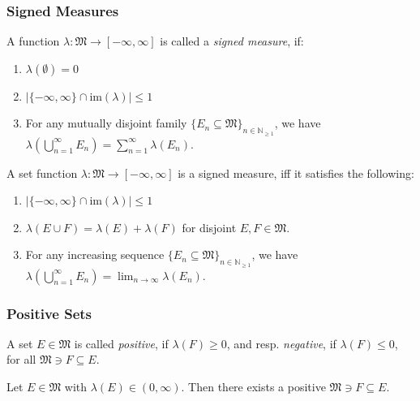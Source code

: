 \documentclass[10pt, hyperref={hidelinks}]{beamer}
\begin{document}
    \begin{frame}
        \frametitle{Signed Measures}

        \begin{definition} \label{def:signed_measures}
            A function \(\lambda\colon \mathfrak{M} \to [-\infty, \infty]\) is called a \emph{signed measure}, if:
            \begin{enumerate}[label=(\roman*)]
                \item \(\lambda(\emptyset) = 0\)
                \item \(|\{-\infty, \infty\} \cap \text{im}(\lambda)| \leq 1\)
                \item For any mutually disjoint family \(\{E_n \subseteq \mathfrak{M}\}_{n \in \mathbb{N}_{\geq 1}}\), we have \(\lambda\left(\bigcup_{n=1}^\infty E_n\right) = \sum_{n=1}^\infty \lambda(E_n)\).
            \end{enumerate}
        \end{definition}

        \pause

        \begin{lemma} \label{lem:limit_characterization_of_signed_measures}
            A set function \(\lambda\colon \mathfrak{M} \to [-\infty, \infty]\) is a signed measure, iff it satisfies the following:
            \begin{enumerate}[label=(\roman*)]
                \item \(|\{-\infty, \infty\} \cap \text{im}(\lambda)| \leq 1\)
                \item \(\lambda(E \cup F) = \lambda(E) + \lambda(F)\) for disjoint \(E, F \in \mathfrak{M}\).
                \item For any increasing sequence \(\{E_n \subseteq \mathfrak{M}\}_{n \in \mathbb{N}_{\geq 1}}\), we have \(\lambda\left(\bigcup_{n=1}^\infty E_n\right) = \lim_{n \to \infty} \lambda(E_n)\).
            \end{enumerate}
        \end{lemma}
    \end{frame}

    \begin{frame}
        \frametitle{Positive Sets}

        \begin{definition}
            A set \(E \in \mathfrak{M}\) is called \emph{positive}, if \(\lambda(F) \geq 0\), and resp. \emph{negative}, if \(\lambda(F) \leq 0\), for all \(\mathfrak{M} \ni F \subseteq E\).
        \end{definition}

        \pause

        \begin{lemma} \label{lem:existence_of_positive_subset}
            Let \(E \in \mathfrak{M}\) with \(\lambda(E) \in (0, \infty)\). Then there exists a positive \(\mathfrak{M} \ni F \subseteq E\).
        \end{lemma}
    \end{frame}
\end{document}
